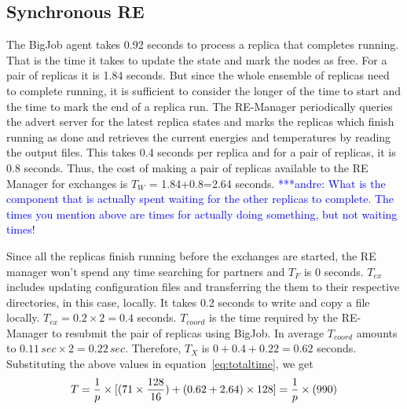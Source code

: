 \documentclass{rspublic}
\newcommand{\alnote}[1]{ {\textcolor{blue} { ***andre: #1 }}}
\newcommand{\athotanote}[1]{ {\textcolor{green} { ***athota: #1 }}}
\newcommand{\alnote}[1]{}
\newcommand{\athotanote}[1]{}
\begin{document}
\subsection{Synchronous RE}
\label{sec:impl_sync_re}

The BigJob agent takes 0.92 seconds to process a replica that
completes running.  That is the time it takes to update the state and
mark the nodes as free. For a pair of replicas it is 1.84 seconds. But
since the whole ensemble of replicas need to complete running, it is
sufficient to consider the longer of the time to start and the time to
mark the end of a replica run.  The RE-Manager periodically queries
the advert server for the latest replica states and marks the replicas
which finish running as done and retrieves the current energies and
temperatures by reading the output files. This takes 0.4 seconds per
replica and for a pair of replicas, it is 0.8 seconds.  Thus, the cost
of making a pair of replicas available to the RE Manager for exchanges
is $T_W$ = 1.84+0.8=2.64 seconds.  \alnote{What is the component that
  is actually spent waiting for the other replicas to complete. The
  times you mention above are times for actually doing something, but
  not waiting times!}

Since all the replicas finish running before the exchanges are
started, the RE manager won't spend any time searching for partners
and $T_F$ is 0 seconds. $T_{ex}$ includes updating configuration files
and transferring the them to their respective directories, in this
case, locally. It takes 0.2 seconds to write and copy a file
locally. $T_{ex} = 0.2 \times 2=0.4$ seconds. $T_{coord}$ is the time
required by the RE-Manager to resubmit the pair of replicas using
BigJob. In average $T_{coord}$ amounts to $0.11\,sec \times 2 =
0.22\,sec$. Therefore, $T_{X}$ is $0+0.4+0.22=0.62$ seconds.
Substituting the above values in equation~\ref{eq:totaltime}, we get
\begin{eqnarray}
  T=  {1 \over p} \times {[ {(71\times {128\over 16}})+ (0.62 + 2.64)\times 128]} = {1 \over p} \times (990)
\label{eq:sync}
\end{eqnarray}
\end{document}
